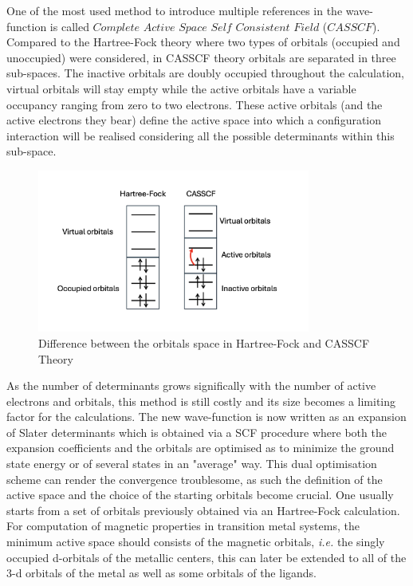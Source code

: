 \documentclass[12pt]{report}
\numberwithin{equation}{section}
\begin{document}
One of the most used method to introduce multiple references in the wave-function is called $Complete$ $Active$ $Space$ $Self$ $Consistent$ $Field$ ($CASSCF$). 
Compared to the Hartree-Fock theory where two types of orbitals (occupied and unoccupied) were considered, in CASSCF theory orbitals are separated in three sub-spaces. The inactive orbitals are doubly occupied throughout the calculation, virtual orbitals will stay empty while the active orbitals have a variable occupancy ranging from zero to two electrons.
These active orbitals (and the active electrons they bear) define the active space into which a configuration interaction will be realised considering all the possible determinants within this sub-space. 
\begin{figure}
    \centering
    \includegraphics[width=0.8\textwidth]{Images/EspaceCAS.png}
    \caption{Difference between the orbitals space in Hartree-Fock and CASSCF Theory}
    \label{CAS}
\end{figure}
As the number of determinants grows significally with the number of active electrons and orbitals,  this method is still costly and its size becomes a limiting factor for the calculations.
The new wave-function is now written as an expansion of Slater determinants which is obtained via a SCF procedure where both the expansion coefficients and the orbitals are optimised as to minimize the ground state energy or of several states in an "average" way. 
This dual optimisation scheme can render the convergence troublesome, as such the definition of the active space and the choice of the starting orbitals become crucial.
One usually starts from a set of orbitals previously obtained via an Hartree-Fock calculation.
For computation of magnetic properties in transition metal systems, the minimum active space should consists of the magnetic orbitals, \textit{i.e.} the singly occupied d-orbitals of the metallic centers, this can later be extended to all of the 3-d orbitals of the metal as well as some orbitals of the ligands.
\end{document}
